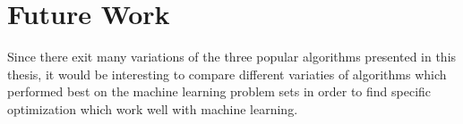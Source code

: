 \section{Future Work}

Since there exit many variations of the three popular algorithms presented in this thesis, it would be interesting to compare different variaties of algorithms which performed best on the machine learning problem sets in order to find specific optimization which work well with machine learning.
